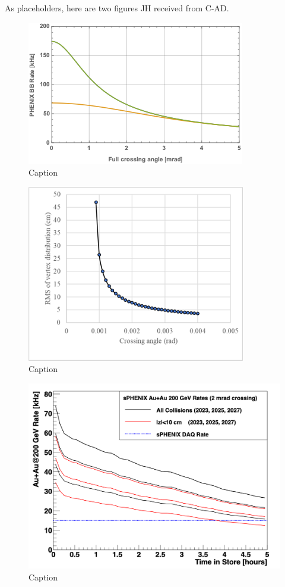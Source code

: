As placeholders, here are two figures JH received from C-AD.

\begin{figure}
    \centering
    \includegraphics[width=0.8\linewidth]{figs/figure_cad1_prelim.png}
    \caption{Caption}
    \label{fig:cad1}
\end{figure}

\begin{figure}
    \centering
    \includegraphics[width=0.8\linewidth]{figs/figure_cad2_prelim.png}
    \caption{Caption}
    \label{fig:cad2}
\end{figure}





\begin{figure}
    \centering
    \includegraphics[width=0.75\linewidth]{figs/figure_sphenix_auaustore.png}
    \caption{Caption}
    \label{fig:sphenixauaustore}
\end{figure}
